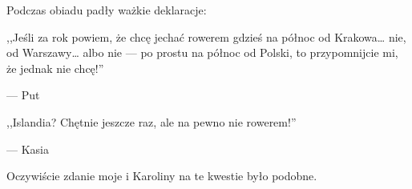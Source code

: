 
Podczas obiadu padły ważkie deklaracje:

\epigraph{,,Jeśli za rok powiem, że chcę jechać rowerem gdzieś na północ od Krakowa… nie, od Warszawy… albo nie --- po prostu na północ od Polski, to przypomnijcie mi, że jednak nie chcę!''}{--- \textup{Put}}

\epigraph{,,Islandia? Chętnie jeszcze raz, ale na pewno nie rowerem!''}{--- \textup{Kasia}}

Oczywiście zdanie moje i Karoliny na te kwestie było podobne.

